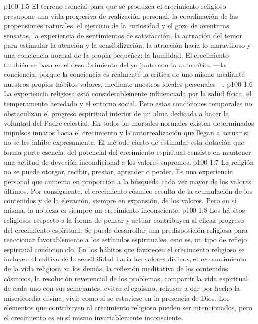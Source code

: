 \vs p100 1:5 \pc El terreno esencial para que se produzca el crecimiento religioso presupone una vida progresiva de realización personal, la coordinación de las propensiones naturales, el ejercicio de la curiosidad y el gozo de aventuras sensatas, la experiencia de sentimientos de satisfacción, la actuación del temor para estimular la atención y la sensibilización, la atracción hacia lo maravilloso y una conciencia normal de la propia pequeñez: la humildad. El crecimiento también se basa en el descubrimiento del yo junto con la autocrítica ---la conciencia, porque la conciencia es realmente la crítica de uno mismo mediante nuestros propios hábitos\hyp{}valores, mediante nuestros ideales personales---.
\vs p100 1:6 \pc La experiencia religiosa está considerablemente influenciada por la salud física, el temperamento heredado y el entorno social. Pero estas condiciones temporales no obstaculizan el progreso espiritual interior de un alma dedicada a hacer la voluntad del Padre celestial. En todos los mortales normales existen determinados impulsos innatos hacia el crecimiento y la autorrealización que llegan a actuar si no se les inhibe expresamente. El método cierto de estimular esta dotación que forma parte esencial del potencial del crecimiento espiritual consiste en mantener una actitud de devoción incondicional a los valores supremos.
\vs p100 1:7 La religión no se puede otorgar, recibir, prestar, aprender o perder. Es una experiencia personal que aumenta en proporción a la búsqueda cada vez mayor de los valores últimos. Por consiguiente, el crecimiento cósmico resulta de la acumulación de los contenidos y de la elevación, siempre en expansión, de los valores. Pero en sí misma, la nobleza es siempre un crecimiento inconsciente.
\vs p100 1:8 Los hábitos religiosos respecto a la forma de pensar y actuar contribuyen al eficaz progreso del crecimiento espiritual. Se puede desarrollar una predisposición religiosa para reaccionar favorablemente a los estímulos espirituales, esto es, un tipo de reflejo espiritual condicionado. En los hábitos que favorecen el crecimiento religioso se incluyen el cultivo de la sensibilidad hacia los valores divinos, el reconocimiento de la vida religiosa en los demás, la reflexión meditativa de los contenidos cósmicos, la resolución reverencial de los problemas, compartir la vida espiritual de cada uno con sus semejantes, evitar el egoísmo, rehusar a dar por hecho la misericordia divina, vivir como si se estuviese en la presencia de Dios. Los elementos que contribuyen al crecimiento religioso pueden ser intencionados, pero el crecimiento es en sí mismo invariablemente inconsciente.
